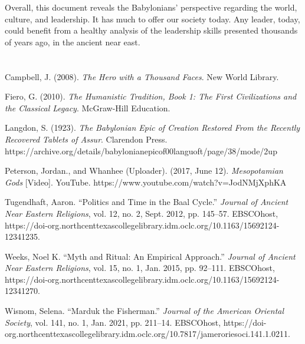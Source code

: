 \documentclass[12pt,a4paper,english]{article}
\begin{document}
Overall, this document reveals the Babylonians' perspective regarding the world, culture, and leadership.
It has much to offer our society today.
Any leader, today, could benefit from a healthy analysis of the leadership skills presented thousands of years ago, in the ancient near east.

\newpage
\section*{}
\begin{hangparas}{2em}{1}
  Campbell, J. (2008). \emph{The Hero with a Thousand Faces}. New World Library.
  \par
  Fiero, G. (2010). \emph{The Humanistic Tradition, Book 1: The First Civilizations and the Classical Legacy}. McGraw-Hill Education.
  \par
  Langdon, S. (1923). \emph{The Babylonian Epic of Creation Restored From the Recently Recovered Tablets of Assur}. Clarendon Press. https://archive.org/details/babylonianepicof00languoft/page/38/mode/2up
  \par
  Peterson, Jordan., and Whanhee (Uploader). (2017, June 12). \emph{Mesopotamian Gods} [Video]. YouTube. https://www.youtube.com/watch?v=JodNMjXphKA
  \par
Tugendhaft, Aaron. “Politics and Time in the Baal Cycle.” \emph{Journal of Ancient Near Eastern Religions}, vol. 12, no. 2, Sept. 2012, pp. 145–57. EBSCOhost, https://doi-org.northcenttexascollegelibrary.idm.oclc.org/10.1163/15692124-12341235.
  \par
  Weeks, Noel K. “Myth and Ritual: An Empirical Approach.” \emph{Journal of Ancient Near Eastern Religions}, vol. 15, no. 1, Jan. 2015, pp. 92–111. EBSCOhost, https://doi-org.northcenttexascollegelibrary.idm.oclc.org/10.1163/15692124-12341270.
  \par
Wisnom, Selena. “Marduk the Fisherman.” \emph{Journal of the American Oriental Society}, vol. 141, no. 1, Jan. 2021, pp. 211–14. EBSCOhost, https://doi-org.northcenttexascollegelibrary.idm.oclc.org/10.7817/jameroriesoci.141.1.0211.
\end{hangparas}
\par
\fussy
\end{document}
